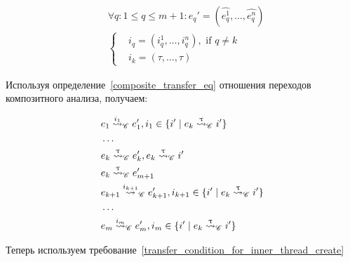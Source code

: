 \begin{align}
& \forall q: 1 \le q \le m + 1: e_q' = (\widehat{e^1_q}, \dots, \widehat{e^n_q}) \nonumber \\
& \begin{cases}
& i_q = (i^1_q, \dots, i^n_q), \mbox{ if } q \neq k \\
& i_k = (\tau, \dots, \tau)
\end{cases} \nonumber
\end{align}

Используя определение~\ref{composite_transfer_eq} отношения переходов композитного анализа, получаем:

\begin{equation}
\label{composite_transfer_eq_3}
\begin{aligned}
& e_1 \stackrel{i_1}{\leadsto}_{\mathscr{C}} e_1', i_1 \in \{i' \mid e_k \stackrel{\uptau}{\leadsto}_{\mathscr{C}} i'\} \\
& \dots \\
& e_k \stackrel{\uptau}{\leadsto}_{\mathscr{C}} e_k', e_k \stackrel{\uptau}{\leadsto}_{\mathscr{C}} i'\\
& e_k \stackrel{\uptau}{\leadsto}_{\mathscr{C}} e_{m+1}'\\
& e_{k+1} \stackrel{i_{k+1}}{\leadsto}_{\mathscr{C}} e_{k+1}', i_{k+1} \in \{i' \mid e_k \stackrel{\uptau}{\leadsto}_{\mathscr{C}} i'\} \\
& \dots \\
& e_m \stackrel{i_m}{\leadsto}_{\mathscr{C}} e_m', i_m \in \{i' \mid e_k \stackrel{\uptau}{\leadsto}_{\mathscr{C}} i'\}
\end{aligned}
\end{equation}

Теперь используем требование~\ref{transfer_condition_for_inner_thread_create}


